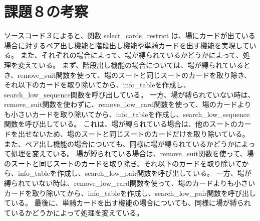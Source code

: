 \documentclass[]{jsarticle}
\begin{document}
\section*{課題８の考察}
ソースコード３によると、関数 select\_cards\_restrict は、場にカードが出ている場合に対するペア出し機能と階段出し機能や単騎カードを出す機能を実現している。
また、それぞれの場合によって、場が縛られているかどうかによって、処理を変えている。
まず、階段出し機能の場合については、場が縛られているとき、remove\_suit関数を使って、場のスートと同じスートのカードを取り除き、それ以下のカードを取り除いてから、info\_tableを作成し、search\_low\_sequence関数を呼び出している。
一方、場が縛られていない時は、remove\_suit関数を使わずに、remove\_low\_card関数を使って、場のカードよりも小さいカードを取り除いてから、info\_tableを作成し、search\_low\_sequence関数を呼び出している。
これは、場が縛られている場合は、他のスートのカードを出せないため、場のスートと同じスートのカードだけを取り除いている。\\

\indent また、ペア出し機能の場合についても、同様に場が縛られているかどうかによって処理を変えている。
場が縛られている場合は、remove\_suit関数を使って、場のスートと同じスートのカードを取り除き、それ以下のカードを取り除いてから、info\_tableを作成し、search\_low\_pair関数を呼び出している。
一方、場が縛られていない時は、remove\_low\_card関数を使って、場のカードよりも小さいカードを取り除いてから、info\_tableを作成し、search\_low\_pair関数を呼び出している。
最後に、単騎カードを出す機能の場合についても、同様に場が縛られているかどうかによって処理を変えている。

\newpage
\end{document}
